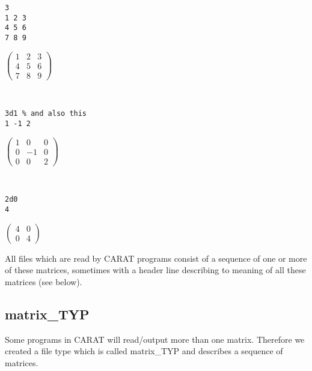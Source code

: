 \bigskip
\begin{minipage}{6cm}
\begin{verbatim}
3
1 2 3
4 5 6
7 8 9
\end{verbatim}
\end{minipage}\hfill
\begin{minipage}{5cm}
$\left( \begin{array}{ccc} 1 & 2 & 3\\
                           4 & 5 & 6\\
                           7 & 8 & 9\end{array}\right)$
\end{minipage}\\
\bigskip
\begin{minipage}{6cm}
\begin{verbatim}
3d1 % and also this
1 -1 2
\end{verbatim}
\end{minipage}\hfill
\begin{minipage}{5cm}
$ \left( \begin{array}{ccc} 1 & 0 & 0\\
                            0 & -1& 0\\
                            0 & 0 & 2\end{array}\right)$
\end{minipage}\\

\bigskip
\begin{minipage}{6cm}
\begin{verbatim}
2d0
4
\end{verbatim}
\end{minipage}\hfill
\begin{minipage}{5cm}
$ \left( \begin{array}{cc} 4 & 0\\
                           0 & 4\end{array}\right)$
\end{minipage}

\bigskip
All files which are read by CARAT programs consist of a sequence of
one or more of these matrices, sometimes with a header line describing
to meaning of all these matrices (see below).

\subsection{\rm matrix\_TYP}

Some programs in CARAT will read/output more than one matrix. Therefore
we created a file type which is called {\rm matrix\_TYP} and describes
a sequence of matrices.

